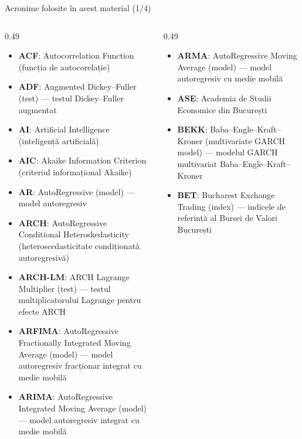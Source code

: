 {
\begin{frame}[noframenumbering]
    \titlepage
\end{frame}
}
\begin{frame}{Acronime folosite în acest material (1/4)}
\begin{columns}[T]
\begin{column}{0.49\textwidth}
\begin{itemize}\setlength{\itemsep}{0pt}
    \item \textbf{ACF}: Autocorrelation Function (funcția de autocorelație)
    \item \textbf{ADF}: Augmented Dickey–Fuller (test) — testul Dickey–Fuller augmentat
    \item \textbf{AI}: Artificial Intelligence (inteligență artificială)
    \item \textbf{AIC}: Akaike Information Criterion (criteriul informațional Akaike)
    \item \textbf{AR}: AutoRegressive (model) — model autoregresiv
    \item \textbf{ARCH}: AutoRegressive Conditional Heteroskedasticity (heteroscedasticitate condiționată autoregresivă)
    \item \textbf{ARCH-LM}: ARCH Lagrange Multiplier (test) — testul multiplicatorului Lagrange pentru efecte ARCH
    \item \textbf{ARFIMA}: AutoRegressive Fractionally Integrated Moving Average (model) — model autoregresiv fracționar integrat cu medie mobilă
    \item \textbf{ARIMA}: AutoRegressive Integrated Moving Average (model) — model autoregresiv integrat cu medie mobilă
\end{itemize}
\end{column}
\begin{column}{0.49\textwidth}
\begin{itemize}\setlength{\itemsep}{0pt}
    \item \textbf{ARMA}: AutoRegressive Moving Average (model) — model autoregresiv cu medie mobilă
    \item \textbf{ASE}: Academia de Studii Economice din București
    \item \textbf{BEKK}: Baba–Engle–Kraft–Kroner (multivariate GARCH model) — modelul GARCH multivariat Baba–Engle–Kraft–Kroner
    \item \textbf{BET}: Bucharest Exchange Trading (index) — indicele de referință al Bursei de Valori București

\end{itemize}
\end{column}
\end{columns}
\end{frame}
